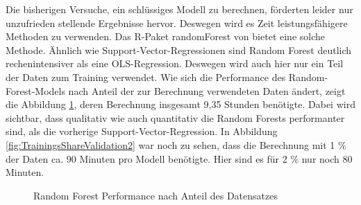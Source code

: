\documentclass[a4paper,12pt]{thesis}
\begin{document}
Die bisherigen Versuche, ein schlüssiges Modell zu berechnen, förderten leider nur unzufrieden stellende Ergebnisse hervor. Deswegen wird es Zeit leistungsfähigere Methoden zu verwenden. Das R-Paket \glqq{}randomForest\grqq{}  von \cite{Liaw2002} bietet eine solche Methode. Ähnlich wie Support-Vector-Regressionen sind Random Forest deutlich rechenintensiver als eine OLS-Regression. Deswegen wird auch hier nur ein Teil der Daten zum Training verwendet. Wie sich die Performance des Random-Forest-Models nach Anteil der zur Berechnung verwendeten Daten ändert, zeigt die Abbildung \ref{fig:TrainingsShareValidation1}, deren Berechnung insgesamt 9,35 Stunden benötigte. Dabei wird sichtbar, dass qualitativ wie auch quantitativ die Random Forests performanter sind, als die vorherige Support-Vector-Regression. In Abbildung \ref{fig:TrainingsShareValidation2} war noch zu sehen, dass die Berechnung mit 1 \% der Daten ca. 90 Minuten pro Modell benötigte. Hier sind es für 2 \% nur noch 80 Minuten.

\begin{figure}%
	\centering
	\qquad
	\caption{Random Forest Performance nach Anteil des Datensatzes}%
	\label{fig:TrainingsShareValidation1}%
\end{figure}
\end{document}
